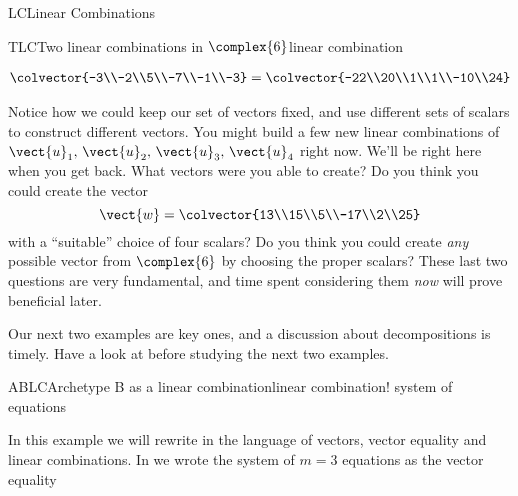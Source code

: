 \begin{subsect}{LC}{Linear Combinations}
\begin{example}{TLC}{Two linear combinations in $\complex{6}$}{linear combination}
\begin{para}
\begin{align*}
\colvector{-3\\-2\\5\\-7\\-1\\-3}
%
=\colvector{-22\\20\\1\\1\\-10\\24}
\end{align*}
\end{para}
%
\begin{para}Notice how we could keep our set of vectors fixed, and use different sets of scalars to construct different vectors.  You might build a few new linear combinations of $\vect{u}_1,\,\vect{u}_2,\,\vect{u}_3,\,\vect{u}_4$ right now.  We'll be right here when you get back.  What vectors were you able to create?  Do you think you could create the vector
%
\begin{equation*}
\vect{w}=\colvector{13\\15\\5\\-17\\2\\25}
\end{equation*}
%
with a ``suitable'' choice of four scalars?  Do you think you could create {\em any} possible vector from $\complex{6}$ by choosing the proper scalars?  These last two questions are very fundamental, and time spent considering them {\em now} will prove beneficial later.\end{para}
\end{example}
%
%
\begin{para}Our next two examples are key ones, and a discussion about decompositions is timely.  Have a look at  before studying the next two examples.\end{para}
%
\begin{example}{ABLC}{Archetype B as a linear combination}{linear combination! system of equations}
\begin{para}In this example we will rewrite  in the language of vectors, vector equality and linear combinations.  In  we wrote the  system of $m=3$ equations as the vector equality
%
\begin{equation*}

\end{equation*}
\end{para}
\end{example}
\end{subsect}

